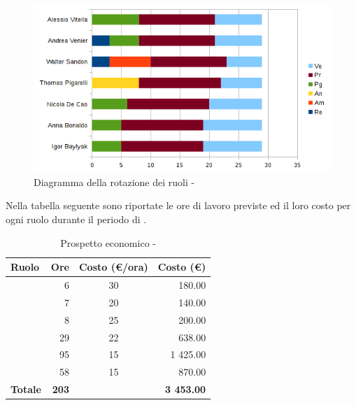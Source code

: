 \documentclass[12pt,a4paper]{article}
\begin{document}
\begin{center}
	\begin{figure}[H]
		\centering		\includegraphics[width=\textwidth]{../img/diagrammaBarreCodificaRotazioneRuoli.png}
		\caption{Diagramma della rotazione dei ruoli - \FPDC{}}
	\end{figure}
\end{center}

\newpage
{}
Nella tabella seguente sono riportate le ore di lavoro previste ed il loro costo per ogni ruolo durante il periodo di \FC.

\begin{table}[H]
	\begin{center}
		\begin{tabular}{l r c r}
			\toprule
			\textbf{Ruolo}	& \textbf{Ore} & \textbf{Costo (\euro/ora)}	& \textbf{Costo (\euro)} \\ \midrule
			\midrule
			\RE{} & 6 & 30 & 180.00 \\ \midrule
			\AM{} & 7 & 20 & 140.00 \\ \midrule
			\AN{} & 8 & 25 & 200.00 \\ \midrule
			\PG{} & 29 & 22 & 638.00 \\ \midrule
			\PR{} & 95 & 15 & 1 425.00 \\ \midrule
			\VR{} & 58 & 15 & 870.00 \\ \midrule
			\textbf{Totale} & \textbf{203} &  & \textbf{3 453.00} \\
			\bottomrule
		\end{tabular}
		\caption{Prospetto economico - \FPDC{}}
	\end{center}
\end{table}
\end{document}

